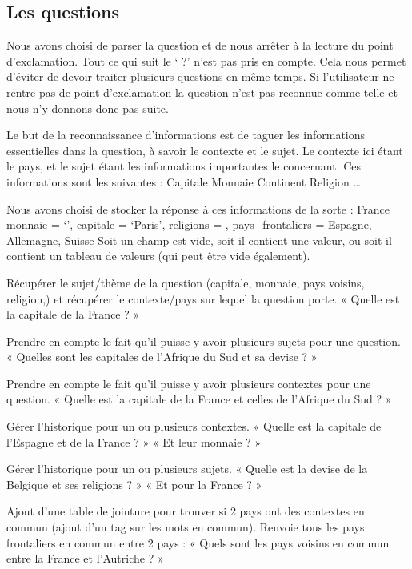\documentclass[11pt,a4paper]{article}
\begin{document}
\subsection{Les questions}

Nous avons choisi de parser la question et de nous arrêter à la lecture du point d’exclamation. Tout ce qui suit le ‘ ?’ n’est pas pris en compte. Cela nous permet d’éviter de devoir traiter plusieurs questions en même temps. Si l’utilisateur ne rentre pas de point d’exclamation la question n’est pas reconnue comme telle et nous n’y donnons donc pas suite.
 
Le but de la reconnaissance d’informations est de taguer les informations essentielles dans la question, à savoir le contexte et le sujet. Le contexte ici étant le pays, et le sujet étant les informations importantes le concernant. Ces informations sont les suivantes :
Capitale
Monnaie
Continent
Religion
…


Nous avons choisi de stocker la réponse à ces informations de la sorte :
France {
            	monnaie = ‘’,
            	capitale = ‘Paris’,
            	religions = {},
            	pays\_frontaliers = { Espagne, Allemagne, Suisse }
}
Soit un champ est vide, soit il contient une valeur, ou soit il contient un tableau de valeurs (qui peut être vide également).
 
 
Récupérer le sujet/thème de la question (capitale, monnaie, pays voisins, religion,) et récupérer le contexte/pays sur lequel la question porte.
« Quelle est la capitale de la France ? » 
 
Prendre en compte le fait qu’il puisse y avoir plusieurs sujets pour une question.
« Quelles sont les capitales de l’Afrique du Sud et sa devise ? »
 
Prendre en compte le fait qu’il puisse y avoir plusieurs contextes pour une question.
« Quelle est la capitale de la France et celles de l’Afrique du Sud ? »
 
Gérer l’historique pour un ou plusieurs contextes.
« Quelle est la capitale de l’Espagne et de la France ? »
« Et leur monnaie ? »
 
Gérer l’historique pour un ou plusieurs sujets.
« Quelle est la devise de la Belgique et ses religions ? »
« Et pour la France ? »
 
Ajout d’une table de jointure pour trouver si 2 pays ont des contextes en commun (ajout d’un tag sur les mots en commun). Renvoie tous les pays frontaliers en commun entre 2 pays :
« Quels sont les pays voisins en commun entre la France et l’Autriche ? »
 
\end{document}
